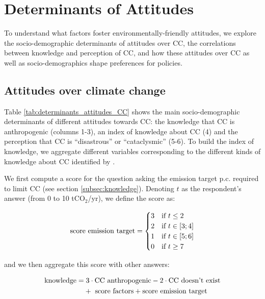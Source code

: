 \documentclass[english,5p,authoryear]{elsarticle}
\begin{document}
%

%


%
%

%

%
%
%
%
%
%


%

\section{Determinants of Attitudes\label{sec:determinants}}

To understand what factors foster environmentally-friendly attitudes, we explore the socio-demographic determinants of attitudes over CC, the correlations between knowledge and perception of CC, and how these attitudes over CC as well as socio-demographics shape preferences for policies. 

    \subsection{Attitudes over climate change}\label{sec:determinants_attitudes_CC}

%
Table \ref{tab:determinants_attitudes_CC} shows the main socio-demographic determinants of different attitudes towards CC: the knowledge that CC is anthropogenic (columns 1-3), an index of knowledge about CC (4) and the perception that CC is ``disastrous'' or ``cataclysmic'' (5-6). To build the index of knowledge, we aggregate different variables corresponding to the different kinds of knowledge about CC identified by \citet{kiel_einfuhrung_2002} \citep[see also][for a summary]{hoppe_what_2018}. 

We first compute a score for the question asking the emission target p.c. required to limit CC (see section \ref{subsec:knowledge}). Denoting $t$ as the respondent's answer (from 0 to 10 tCO$_2$/yr), we define the score as:

\begin{equation}
\textnormal{score emission target}=\begin{cases}
3 & \text{if }t\leq2\\
2 & \text{if }t\in\left[3;4\right]\\
1 & \text{if }t\in\left[5;6\right]\\
0 & \text{if }t\geq7
\end{cases}
\end{equation}

\noindent and we then aggregate this score with other answers:

\begin{align}
\textnormal{knowledge} = & \; 3\cdot \textnormal{CC anthropogenic}-2\cdot \textnormal{CC doesn't exist} \nonumber \\ & + \textnormal{ score factors}+\textnormal{score emission target} \label{eq:knowledge2}
\end{align}
\end{document}
